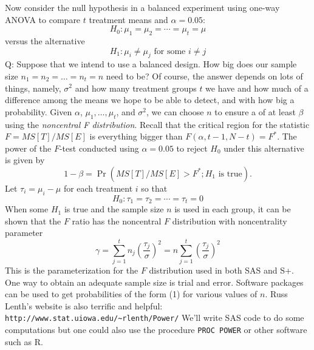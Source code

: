 
\bigkn
Now consider the null hypothesis in a balanced experiment using
one-way ANOVA to compare $t$ treatment means and $\alpha=0.05$:
$$H_0:\mu_1=\mu_2=\cdots=\mu_t=\mu$$
versus the alternative
$$H_1:\mu_i \neq \mu_j \mbox{ for some }i\neq j$$
\bigkn
Q: Suppose that we intend to use a balanced design. How big does
our sample size $n_1=n_2=\ldots=n_t=n$ need to be?
\bigkn
Of course, the answer depends on lots of things, namely, $\sigma^2$
and how many treatment groups $t$ we have and how much of a difference
among the means we hope to be able to detect, and with how big a
probability.
\bigkn
Given $\alpha$, $\mu_1,\ldots,\mu_t$, and $\sigma^2$, we can choose
$n$ to ensure a  of at least $\beta$ using the {\em noncentral
F distribution}.
\bigkn
Recall that the critical region for the statistic $F=MS[T]/MS[E]$ is
everything bigger than $F(\alpha,t-1,N-t)=F^*$.
\bigkn
The power of the $F$-test conducted using $\alpha=0.05$ to reject
$H_0$ under this alternative is given by
\begin{equation}
1-\beta  = \Pr(MS[T]/MS[E] > F^*;H_1 \mbox{ is true}).
\end{equation}
\newpage
Let $\tau_i=\mu_i-\mu$ for each treatment $i$ so that
$$ H_0: \tau_1=\tau_2=\cdots=\tau_t=0$$
When some $H_1$ is true and the sample size $n$ is used in each group, it can 
be shown that the $F$ ratio has the noncentral $F$ distribution with 
noncentrality parameter
$$ \gamma = \sum_{j=1}^t n_j \left(\frac{\tau_j}{\sigma}\right)^2 = n \sum_{j=1}^t \left(\frac{\tau_j}{\sigma}\right)^2 $$
This is the parameterization for the $F$ distribution used
in both SAS and S+.  %
\bigkn
One way to obtain an adequate sample size is trial and error.  Software
packages can be used to get probabilities of the form (1) for various values
of $n$.  Russ Lenth's website is also terrific and helpful:
\bigkn
{\tt http://www.stat.uiowa.edu/\~{}rlenth/Power/}
\bigkn
We'll write SAS code to do some computations but one could also use the
procedure {\tt PROC POWER} or other software such as R.

